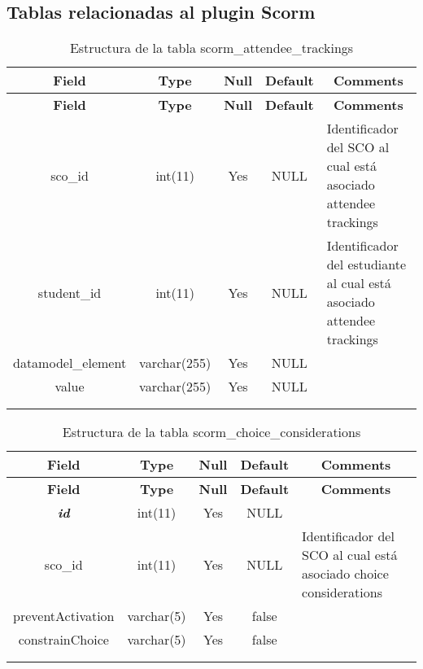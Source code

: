 \subsection{Tablas relacionadas al plugin Scorm}
%
%
\begin{longtable}{c c c c l}
	\multicolumn{1}{c}{\textbf{Field}} &
	\multicolumn{1}{c}{\textbf{Type}} &
	\multicolumn{1}{c}{\textbf{Null}} &
	\multicolumn{1}{c}{\textbf{Default}} &
	\multicolumn{1}{c}{\textbf{Comments}} \\ \hline \hline
\endfirsthead
	\multicolumn{1}{c}{\textbf{Field}} &
	\multicolumn{1}{c}{\textbf{Type}} &
	\multicolumn{1}{c}{\textbf{Null}} &
	\multicolumn{1}{c}{\textbf{Default}} &
	\multicolumn{1}{c}{\textbf{Comments}} \\ \hline \hline
\endhead \endfoot
	sco\_id & int(11) & Yes & NULL & \parbox[t]{0.35\textwidth}{Identificador del SCO al cual está asociado attendee trackings}\\ \hline 
	student\_id & int(11) & Yes & NULL & \parbox[t]{0.35\textwidth}{Identificador del estudiante al cual está asociado attendee trackings}\\ \hline 
	datamodel\_element & varchar(255) & Yes & NULL \\ \hline 
	value & varchar(255) & Yes & NULL \\ \\ 
\caption{Estructura de la tabla scorm\_attendee\_trackings} \label{tab:scorm_attendee_trackings-structure} \\
\end{longtable}

%
%
\begin{longtable}{c c c c l}
	\multicolumn{1}{c}{\textbf{Field}} &
	\multicolumn{1}{c}{\textbf{Type}} &
	\multicolumn{1}{c}{\textbf{Null}} &
	\multicolumn{1}{c}{\textbf{Default}} &
	\multicolumn{1}{c}{\textbf{Comments}} \\ \hline \hline
\endfirsthead
	\multicolumn{1}{c}{\textbf{Field}} &
	\multicolumn{1}{c}{\textbf{Type}} &
	\multicolumn{1}{c}{\textbf{Null}} &
	\multicolumn{1}{c}{\textbf{Default}} &
	\multicolumn{1}{c}{\textbf{Comments}} \\ \hline \hline
\endhead \endfoot
	\textbf{\textit{id}} & int(11) & Yes & NULL \\ \hline 
	sco\_id & int(11) & Yes & NULL & \parbox[t]{0.35\textwidth}{Identificador del SCO al cual está asociado choice considerations}\\ \hline 
	preventActivation & varchar(5) & Yes & false \\ \hline 
	constrainChoice & varchar(5) & Yes & false \\ \\ 
\caption{Estructura de la tabla scorm\_choice\_considerations} \label{tab:scorm_choice_considerations-structure} \\ 
\end{longtable}


